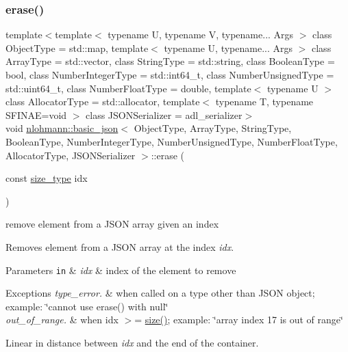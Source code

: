 \subsubsection{\texorpdfstring{erase()}{erase()}\hspace{0.1cm}{\footnotesize\ttfamily [4/4]}}
{\footnotesize\ttfamily template$<$template$<$ typename U, typename V, typename... Args $>$ class Object\+Type = std\+::map, template$<$ typename U, typename... Args $>$ class Array\+Type = std\+::vector, class String\+Type  = std\+::string, class Boolean\+Type  = bool, class Number\+Integer\+Type  = std\+::int64\+\_\+t, class Number\+Unsigned\+Type  = std\+::uint64\+\_\+t, class Number\+Float\+Type  = double, template$<$ typename U $>$ class Allocator\+Type = std\+::allocator, template$<$ typename T, typename S\+F\+I\+N\+A\+E=void $>$ class J\+S\+O\+N\+Serializer = adl\+\_\+serializer$>$ \\
void \mbox{\hyperlink{classnlohmann_1_1basic__json}{nlohmann\+::basic\+\_\+json}}$<$ Object\+Type, Array\+Type, String\+Type, Boolean\+Type, Number\+Integer\+Type, Number\+Unsigned\+Type, Number\+Float\+Type, Allocator\+Type, J\+S\+O\+N\+Serializer $>$\+::erase (\begin{DoxyParamCaption}\item[{const \mbox{\hyperlink{classnlohmann_1_1basic__json_a39f2cd0b58106097e0e67bf185cc519b}{size\+\_\+type}}}]{idx }\end{DoxyParamCaption})\hspace{0.3cm}{\ttfamily [inline]}}



remove element from a J\+S\+ON array given an index 

Removes element from a J\+S\+ON array at the index {\itshape idx}.


\begin{DoxyParams}[1]{Parameters}
\mbox{\tt in}  & {\em idx} & index of the element to remove\\
\hline
\end{DoxyParams}

\begin{DoxyExceptions}{Exceptions}
{\em type\+\_\+error.} & when called on a type other than J\+S\+ON object; example\+: {\ttfamily \char`\"{}cannot use erase() with null\char`\"{}} \\
\hline
{\em out\+\_\+of\+\_\+range.} & when {\ttfamily idx $>$= \mbox{\hyperlink{classnlohmann_1_1basic__json_a25e27ad0c6d53c01871c5485e1f75b96}{size()}}}; example\+: {\ttfamily \char`\"{}array index 17
is out of range\char`\"{}}\\
\hline
\end{DoxyExceptions}
Linear in distance between {\itshape idx} and the end of the container.

